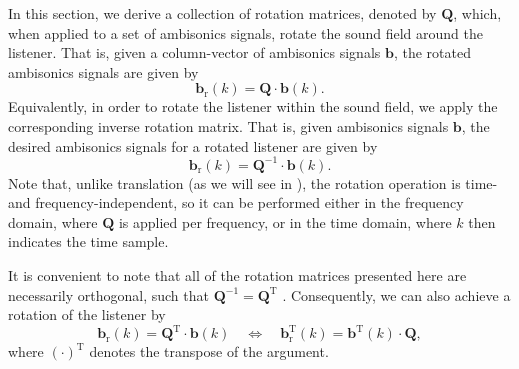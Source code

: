 In this section, we derive a collection of rotation matrices, denoted by $\mathbf{Q}$, which, when applied to a set of ambisonics signals, rotate the sound field around the listener.
That is, given a column-vector of ambisonics signals $\mathbf{b}$, the rotated ambisonics signals are given by
\begin{equation}
\mathbf{b}_\text{r}(k) = \mathbf{Q} \cdot \mathbf{b}(k).
\end{equation}
Equivalently, in order to rotate the listener within the sound field, we apply the corresponding inverse rotation matrix.
That is, given ambisonics signals $\mathbf{b}$, the desired ambisonics signals for a rotated listener are given by
\begin{equation}
\mathbf{b}_\text{r}(k) = \mathbf{Q}^{-1} \cdot \mathbf{b}(k).
\end{equation}
Note that, unlike translation (as we will see in ), the rotation operation is time- and frequency-independent, so it can be performed either in the frequency domain, where $\mathbf{Q}$ is applied per frequency, or in the time domain, where $k$ then indicates the time sample.

It is convenient to note that all of the rotation matrices presented here are necessarily orthogonal, such that $\mathbf{Q}^{-1} = \mathbf{Q}^\text{T}$ \citep{Choi1999}.
Consequently, we can also achieve a rotation of the listener by
\begin{equation}\label{eq:A1_Navigation_Filters:Listener_Rotation}
\mathbf{b}_\text{r}(k) = \mathbf{Q}^\text{T} \cdot \mathbf{b}(k) \quad \iff \quad \mathbf{b}_\text{r}^\text{T}(k) = \mathbf{b}^\text{T}(k) \cdot \mathbf{Q},
\end{equation}
where $(\cdot)^\text{T}$ denotes the transpose of the argument.

